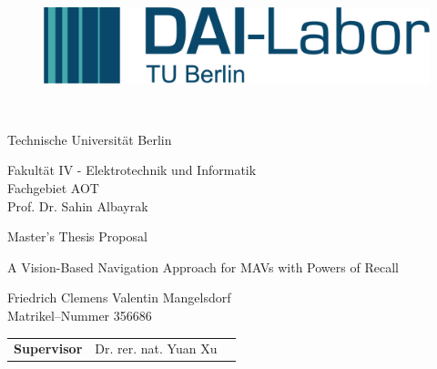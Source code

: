 \thispagestyle{empty}
\begin{figure}[htbp]
	\centering
 \begin{minipage}[b]{41 mm}
   \includegraphics[width=40 mm]{figures/DAI_Logo.png}
 \end{minipage}
\end{figure}

~\vspace{0.5cm}

\begin{center}
\begin{Huge}
Technische Universit\"at Berlin\\
\vspace{1mm}
\end{Huge}{\Large Fakult\"at IV - Elektrotechnik und Informatik\\
Fachgebiet AOT\\
Prof. Dr. Sahin Albayrak}\\

\vspace{26mm}
\begin{LARGE}
Master's Thesis Proposal\\
\end{LARGE}
\vspace{8mm}
\begin{LARGE}
A Vision-Based Navigation Approach for MAVs with Powers of Recall\\
\end{LARGE}
\vspace{3 cm}
Friedrich Clemens Valentin Mangelsdorf\\
Matrikel--Nummer 356686\\
\vspace{1cm}
\begin{tabular}{lll}
\textbf{Supervisor} & Dr. rer. nat. Yuan Xu \\%
\end{tabular}

\end{center}

